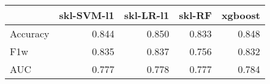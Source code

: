 \begin{tabular}{lrrrr}
\toprule
{} &  skl-SVM-l1 &  skl-LR-l1 &  skl-RF &  xgboost \\
\midrule
Accuracy &       0.844 &      0.850 &   0.833 &    0.848 \\
F1w      &       0.835 &      0.837 &   0.756 &    0.832 \\
AUC      &       0.777 &      0.778 &   0.777 &    0.784 \\
\bottomrule
\end{tabular}
